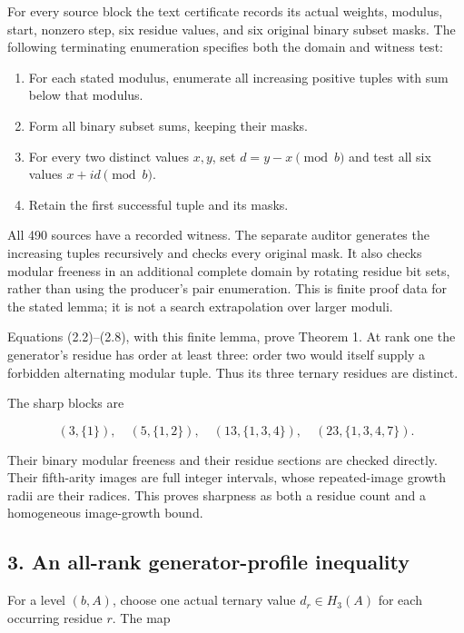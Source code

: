 For every source block the text certificate records its actual weights, modulus, start, nonzero step, six residue values, and six original binary subset masks. The following terminating enumeration specifies both the domain and witness test:

\begin{enumerate}
\def\labelenumi{\arabic{enumi}.}
\tightlist
\item
  For each stated modulus, enumerate all increasing positive tuples with sum below that modulus.
\item
  Form all binary subset sums, keeping their masks.
\item
  For every two distinct values \(x,y\), set \(d=y-x\pmod b\) and test all six values \(x+id\pmod b\).
\item
  Retain the first successful tuple and its masks.
\end{enumerate}

All 490 sources have a recorded witness. The separate auditor generates the increasing tuples recursively and checks every original mask. It also checks modular freeness in an additional complete domain by rotating residue bit sets, rather than using the producer's pair enumeration. This is finite proof data for the stated lemma; it is not a search extrapolation over larger moduli.

Equations (2.2)--(2.8), with this finite lemma, prove Theorem 1. At rank one the generator's residue has order at least three: order two would itself supply a forbidden alternating modular tuple. Thus its three ternary residues are distinct.

The sharp blocks are

\[
(3,\{1\}),\quad(5,\{1,2\}),\quad
(13,\{1,3,4\}),\quad(23,\{1,3,4,7\}).
\tag{2.9}
\]

Their binary modular freeness and their residue sections are checked directly. Their fifth-arity images are full integer intervals, whose repeated-image growth radii are their radices. This proves sharpness as both a residue count and a homogeneous image-growth bound.

\subsection{3. An all-rank generator-profile inequality}\label{an-all-rank-generator-profile-inequality}

For a level \((b,A)\), choose one actual ternary value \(d_r\in H_3(A)\) for each occurring residue \(r\). The map

